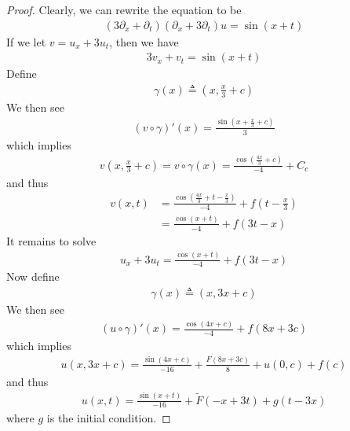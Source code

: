 \documentclass{report}
\begin{document}
\begin{proof}
Clearly, we can rewrite the equation to be 
\begin{align*}
  (3\partial_x + \partial_t )(\partial_x + 3\partial_t)u=\sin (x+t)
\end{align*}
If we let $v=u_x+3u_t$, then  we have 
\begin{align*}
3v_x+v_t= \sin (x+t)
\end{align*}
Define 
\begin{align*}
\gamma (x)\triangleq  (x, \frac{x}{3}+c)
\end{align*}
We then see 
\begin{align*}
  (v\circ \gamma )'(x)= \frac{\sin (x+ \frac{x}{3}+c)}{3}
\end{align*}
which implies 
\begin{align*}
v(x, \frac{x}{3}+c) = v\circ \gamma  (x)= \frac{\cos (\frac{4x}{3}+c)}{-4}+ C_c
\end{align*}
and thus 
\begin{align*}
v(x,t)&= \frac{\cos (\frac{4x}{3}+ t- \frac{x}{3})}{-4}+f(t-\frac{x}{3})\\
&= \frac{\cos (x+t)}{-4}+f(3t-x)
\end{align*}
It remains to solve 
\begin{align*}
u_x+ 3u_t= \frac{\cos (x+t)}{-4}+ f(3t-x)
\end{align*}
Now define 
\begin{align*}
\gamma  (x)\triangleq  (x,3x+c)
\end{align*}
We then see 
\begin{align*}
  (u\circ \gamma )'(x)= \frac{\cos (4x+c)}{-4} + f(8x+3c)
\end{align*}
which implies 
\begin{align*}
u(x,3x+c)= \frac{\sin (4x+c)}{-16}+\frac{F(8x+3c)}{8}+u(0,c)+f(c)
\end{align*}
and thus 
\begin{align*}
u(x,t)= \frac{\sin (x+t)}{-16}+ \tilde{F}(-x+3t)+ g(t-3x)
\end{align*}
where $g$ is the initial condition. 
\end{proof}
\end{document}
